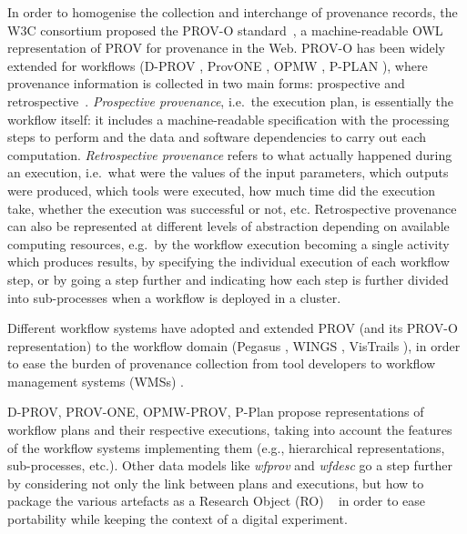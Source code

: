 \documentclass[10pt,letterpaper]{article}
\begin{document}
In order to homogenise the collection and interchange of provenance records, the W3C consortium proposed the PROV-O standard~\cite{Lebo 2013}, a machine-readable OWL \cite{W3C OWL Working Group 2012} representation of PROV for provenance in the Web.
PROV-O has been widely extended for workflows (D-PROV \cite{Missier 2013}, ProvONE \cite{Cuevas-Vicenttín 2016}, OPMW \cite{Garijo 2011}, P-PLAN \cite{Garijo 2012}), where provenance information is collected in two main forms: prospective and retrospective~\cite{Freire 2008}. \emph{Prospective provenance}, i.e.~the execution plan, is essentially the workflow itself: it includes a machine-readable specification with the processing steps to perform and the data and software dependencies to carry out each computation.
\emph{Retrospective provenance} refers to what actually happened during an execution, i.e.~what were the values of the input parameters, which outputs were produced, which tools were executed, how much time did the execution take, whether the execution was successful or not, etc.
Retrospective provenance can also be represented at different levels of abstraction depending on available computing resources, e.g.~by the workflow execution becoming a single activity which produces results, by specifying the individual execution of each workflow step, or by going a step further and indicating how each step is further divided into sub-processes when a workflow is deployed in a cluster.

Different workflow systems have adopted and extended PROV (and its PROV-O representation) to the workflow domain (Pegasus \cite{Deelman 2005}, WINGS \cite{Garijo 2014}, VisTrails \cite{Scheidegger 2008,Costa 2013}), in order to ease the burden of provenance collection from tool developers to workflow management systems (WMSs) \cite{Atkinson 2017,Pérez 2018}.

D-PROV, PROV-ONE, OPMW-PROV, P-Plan propose representations of workflow plans and their respective executions, taking into account the features of the workflow systems implementing them (e.g., hierarchical representations, sub-processes, etc.).
Other data models like \emph{wfprov} and \emph{wfdesc}
\cite{Belhajjame 2015} go a step further by considering not only the link between plans and executions, but how to package the various artefacts as a Research Object (RO) ~\cite{Bechhofer 2013} in order to ease portability while keeping the context of a digital experiment.
\end{document}
